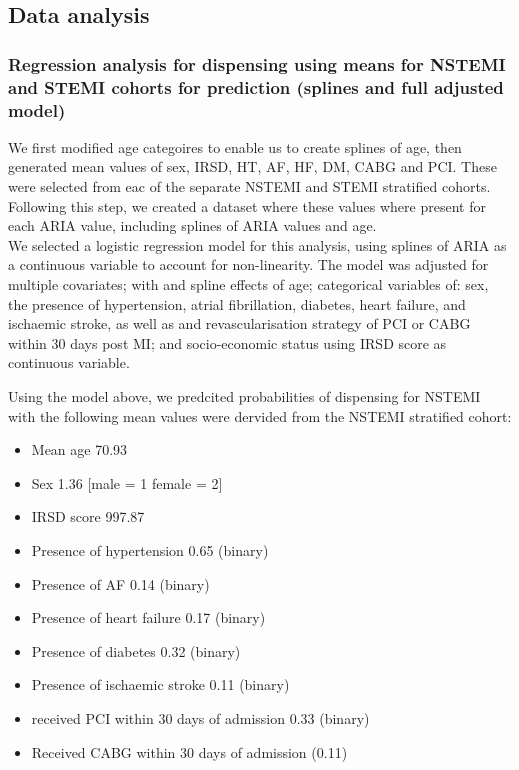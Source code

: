 \documentclass[11pt]{article}
\begin{document}
\subsection{Data analysis}
\subsubsection{Regression analysis for dispensing using means for NSTEMI and STEMI cohorts for prediction (splines and full adjusted model)}
We first modified age categoires to enable us to create splines of age, then generated mean values of sex, IRSD, HT, AF, HF, DM, CABG and PCI. These were selected from eac of the separate NSTEMI and STEMI stratified cohorts. Following this step, we created a dataset where these values where present for each ARIA value, including splines of ARIA values and age.\\
We selected a logistic regression model for this analysis, using splines of ARIA as a continuous variable to account for non-linearity. The model was adjusted for multiple covariates; with and spline effects of age; categorical variables of: sex, the presence of hypertension, atrial fibrillation, diabetes, heart failure, and ischaemic stroke, as well as and revascularisation strategy of PCI or CABG within 30 days post MI; and socio-economic status using IRSD score as continuous variable. \\
\color{violet}
\begin{stlog}\end{stlog}
\color{black}
Using the model above, we predcited probabilities of dispensing for NSTEMI with the following mean values were dervided from the NSTEMI stratified cohort: \\
\begin{itemize}
\item Mean age 70.93
\item Sex 1.36 [male = 1 female = 2]
\item IRSD score 997.87
\item Presence of hypertension 0.65 (binary)
\item Presence of AF 0.14 (binary)
\item Presence of heart failure 0.17 (binary)
\item Presence of diabetes 0.32 (binary)
\item Presence of ischaemic stroke 0.11 (binary)
\item received PCI within 30 days of admission 0.33 (binary)
\item Received CABG within 30 days of admission (0.11)
\end{itemize}
\end{document}
